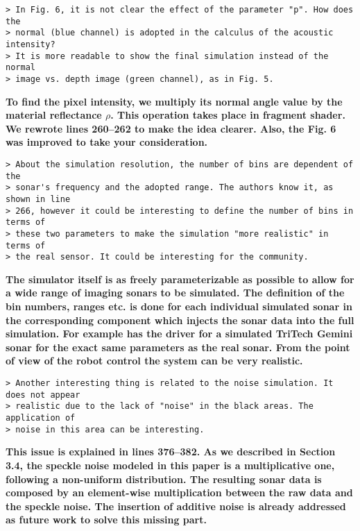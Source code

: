 \documentclass{article}
\begin{document}
\begin{verbatim}
> In Fig. 6, it is not clear the effect of the parameter "p". How does the
> normal (blue channel) is adopted in the calculus of the acoustic intensity?
> It is more readable to show the final simulation instead of the normal
> image vs. depth image (green channel), as in Fig. 5.
\end{verbatim}

\textbf{To find the pixel intensity, we multiply its normal angle value by the
material reflectance $\rho$. This operation takes place in fragment shader.
We rewrote lines 260--262 to make the idea clearer. Also, the Fig. 6 was
improved to take your consideration.}

\begin{verbatim}
> About the simulation resolution, the number of bins are dependent of the
> sonar's frequency and the adopted range. The authors know it, as shown in line
> 266, however it could be interesting to define the number of bins in terms of
> these two parameters to make the simulation "more realistic" in terms of
> the real sensor. It could be interesting for the community.
\end{verbatim}

\textbf{The simulator itself is as freely parameterizable as possible to allow for a wide range of imaging
sonars to be simulated. The definition of the bin numbers, ranges etc. is done for each individual
simulated sonar in the corresponding component which injects the sonar data into the full simulation.
For example has the driver for a simulated TriTech Gemini sonar for the exact same parameters as the
real sonar. From the point of view of the robot control the system can be very realistic.}

\begin{verbatim}
> Another interesting thing is related to the noise simulation. It does not appear
> realistic due to the lack of "noise" in the black areas. The application of
> noise in this area can be interesting.
\end{verbatim}

\textbf{This issue is explained in lines 376--382. As we described in
Section 3.4, the speckle noise modeled in this paper is a multiplicative one,
following a non-uniform distribution. The resulting sonar data is composed by
an element-wise multiplication between the raw data and the speckle noise. The
insertion of additive noise is already addressed as future work to solve this
missing part.}
\end{document}
